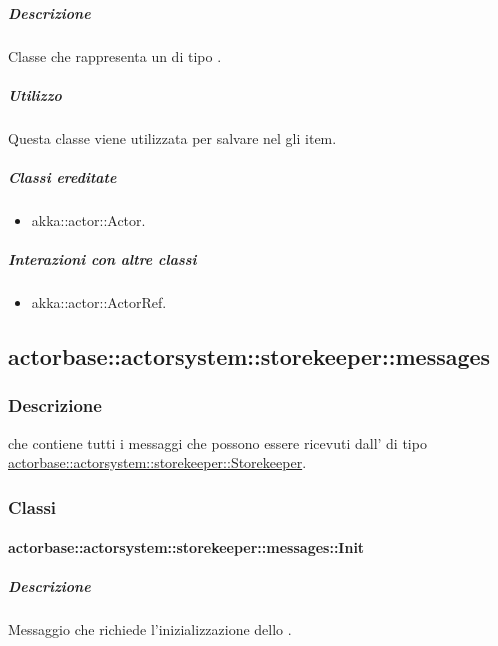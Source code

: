 \documentclass{scalatekids-article}
\begin{document}
\subparagraph{Descrizione}

Classe che rappresenta un  di tipo .

\subparagraph{Utilizzo}

Questa classe viene utilizzata per salvare nel  gli item.

\subparagraph{Classi ereditate}

\begin{itemize}

\item akka::actor::Actor.

\end{itemize}

\subparagraph{Interazioni con altre classi}

\begin{itemize}
\item akka::actor::ActorRef.
\end{itemize}

\subsection{actorbase::actorsystem::storekeeper::messages}
\label{sec:actorbase::actorsystem::storekeeper::messages}

\subsubsection{Descrizione}

 che contiene tutti i messaggi che possono essere
ricevuti dall' di tipo
\hyperref[sec:actorbase::actorsystem::storekeeper::Storekeeper]{actorbase::\allowbreak{}actorsystem::\allowbreak{}storekeeper::\allowbreak{}Storekeeper}.

\subsubsection{Classi}

\paragraph{actorbase::actorsystem::storekeeper::messages::Init}
\label{sec:actorbase::actorsystem::storekeeper::messages::Init}

\subparagraph{Descrizione}

Messaggio che richiede l'inizializzazione dello .
\end{document}
